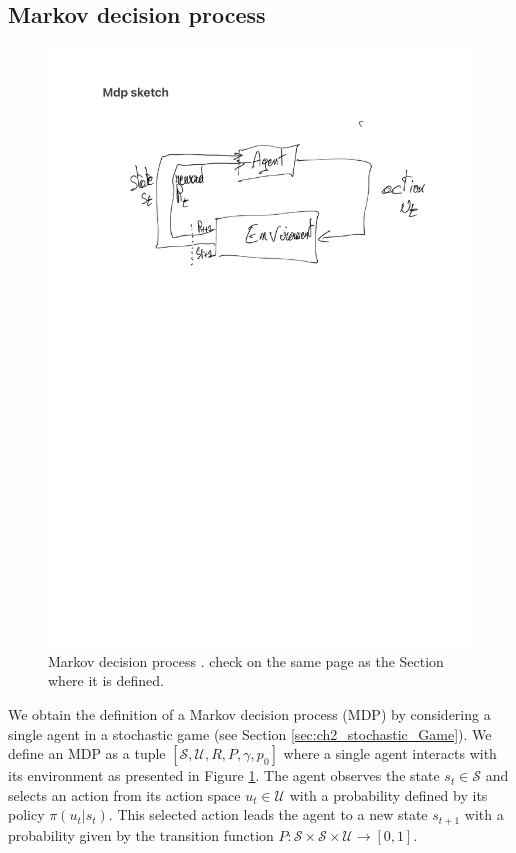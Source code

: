 \subsection{Markov decision process} \label{sec:ch2_mdp}
\begin{figure}
    \centering
    \includegraphics[width=\textwidth]{tex_thesis/figures/ch2/mdp_sketch.pdf}
    \caption{Markov decision process \citep{sutton2018reinforcement}. \todo check on the same page as the Section where it is defined.}
    \label{fig:ch2_mdp}
\end{figure}

We obtain the definition of a Markov decision process (MDP) by considering a single agent in a stochastic game (see Section \ref{sec:ch2_stochastic_Game}).
We define an MDP as a tuple $[\mathcal{S}, \mathcal{U}, R, P, \gamma, p_0]$ where a single agent interacts with its environment as presented in Figure \ref{fig:ch2_mdp}.
The agent observes the state $s_t \in \mathcal{S}$ and selects an action from its action space $u_t \in \mathcal{U}$ with a probability defined by its policy $\pi(u_t|s_t)$.
This selected action leads the agent to a new state $s_{t+1}$ with a probability given by the transition function $P:\mathcal{S} \times \mathcal{S} \times \mathcal{U} \rightarrow [0,1]$.

